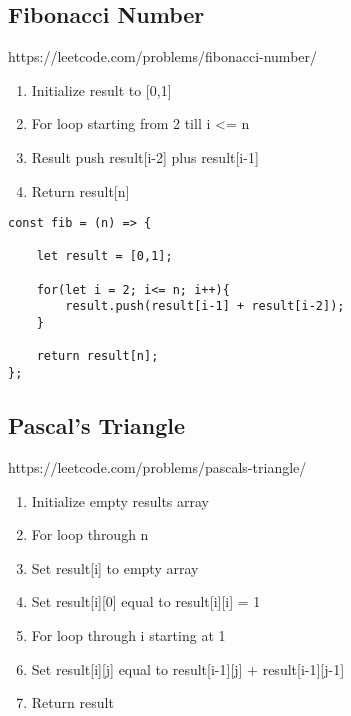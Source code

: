\documentclass[10pt]{article}
\begin{document}
\medskip %







\pagebreak %
\medskip   
\subsection{Fibonacci Number}
https://leetcode.com/problems/fibonacci-number/

\begin{enumerate}
	\item Initialize result to [0,1]
	\item For loop starting from 2 till i <= n
	\item Result push result[i-2] plus result[i-1]
	\item Return result[n]
\end{enumerate}

\begin{lstlisting}[title=Solution fib, captionpos=t]
const fib = (n) => {
    
    let result = [0,1];
    
    for(let i = 2; i<= n; i++){
        result.push(result[i-1] + result[i-2]);
    }
    
    return result[n];
};
\end{lstlisting}
\medskip %







\pagebreak %
\medskip   
\subsection{Pascal's Triangle}
https://leetcode.com/problems/pascals-triangle/

\begin{enumerate}
	\item Initialize empty results array
	\item For loop through n 
	\item Set result[i] to empty array 
	\item Set result[i][0] equal to result[i][i] = 1
	\item For loop through i starting at 1
	\item Set result[i][j] equal to result[i-1][j] + result[i-1][j-1]
	\item Return result
\end{enumerate}
\end{document}
